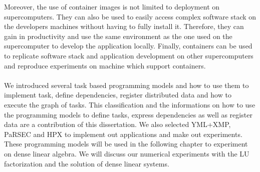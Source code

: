 Moreover, the use of container images is not limited to deployment on supercomputers.
They can also be used to easily access complex software stack on the developers machines without having to fully install it.
Therefore, they can gain in productivity and use the same environment as the one used on the supercomputer to develop the application locally.
Finally, containers can be used to replicate software stack and application development on other supercomputers and reproduce experiments on machine which support containers.


\paragraph{}
We introduced several task based programming models and how to use them to implement task, define dependencies, register distributed data and how to execute the graph of tasks.
This classification and the informations on how to use the programming models to define tasks, express dependencies as well as register data are a contribution of this dissertation.
We also selected YML+XMP, PaRSEC and HPX to implement out applications and make out experiments.
These programming models will be used in the following chapter to experiment on dense linear algebra.
We will discuss our numerical experiments with the LU factorization and the solution of dense linear systems.